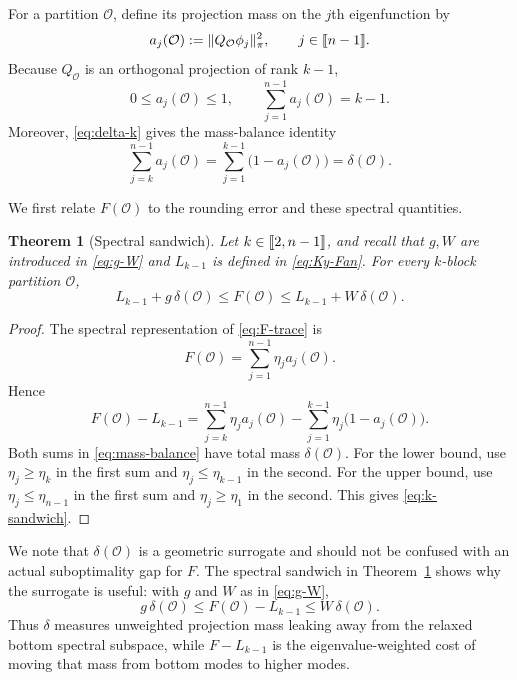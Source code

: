 \documentclass[11pt]{article}
\newtheorem{theorem}{Theorem}[section]
\newcommand{\1}{\mathbf{1}}
\providecommand{\llbracket}{\mathopen{[\mkern-2.7mu[}}
\providecommand{\rrbracket}{\mathclose{]\mkern-2.7mu]}}
\begin{document}
For a partition $\mathcal O$, define its projection mass on the
$j$th eigenfunction by
\begin{equation}
    a_j(\mathcal O)
    :=\|Q_{\mathcal O}\phi_j\|_\pi^2,
    \qquad j\in\llbracket n-1\rrbracket.
    \label{eq:spectral-projection-mass}
\end{equation}
Because $Q_{\mathcal O}$ is an orthogonal projection of rank $k-1$,
\begin{equation*}
    0\leq a_j(\mathcal O)\leq1,
    \qquad
    \sum_{j=1}^{n-1}a_j(\mathcal O)=k-1.
\end{equation*}
Moreover, \eqref{eq:delta-k} gives the mass-balance identity
\begin{equation}
    \sum_{j=k}^{n-1}a_j(\mathcal O)
    =\sum_{j=1}^{k-1}\bigl(1-a_j(\mathcal O)\bigr)
    =\delta(\mathcal O).
    \label{eq:mass-balance}
\end{equation}

We first relate $F(\mathcal O)$ to the rounding error and these
spectral quantities.
\begin{theorem}[Spectral sandwich]
\label{thm:k-sandwich}
Let $k\in\llbracket 2,n-1\rrbracket$, and recall that $g, W$ are introduced in \eqref{eq:g-W} and $L_{k-1}$ is defined in \eqref{eq:Ky-Fan}. For every $k$-block partition $\mathcal O$,
\begin{equation}
    L_{k-1}+g\,\delta(\mathcal O)
    \leq F(\mathcal O)
    \leq L_{k-1}+W\,\delta(\mathcal O).
    \label{eq:k-sandwich}
\end{equation}
\end{theorem}

\begin{proof}
The spectral representation of \eqref{eq:F-trace} is
\[
    F(\mathcal O)
    =\sum_{j=1}^{n-1}\eta_ja_j(\mathcal O).
\]
Hence
\[
    F(\mathcal O)-L_{k-1}
    =\sum_{j=k}^{n-1}\eta_ja_j(\mathcal O)
     -\sum_{j=1}^{k-1}\eta_j
       \bigl(1-a_j(\mathcal O)\bigr).
\]
Both sums in \eqref{eq:mass-balance} have total mass
$\delta(\mathcal O)$.  For the lower bound, use
$\eta_j\geq\eta_{k}$ in the first sum and
$\eta_j\leq\eta_{k-1}$ in the second.  For the upper bound, use
$\eta_j\leq\eta_{n-1}$ in the first sum and
$\eta_j\geq\eta_1$ in the second.  This gives
\eqref{eq:k-sandwich}.
\end{proof}

We note that $\delta(\mathcal O)$ is a geometric surrogate and should not
be confused with an actual suboptimality gap for $F$.  The
spectral sandwich in Theorem~\ref{thm:k-sandwich} shows why the
surrogate is useful: with $g$ and $W$ as in \eqref{eq:g-W},
\[
g\,\delta(\mathcal O)
\leq F(\mathcal O)-L_{k-1}
\leq W\,\delta(\mathcal O).
\]
Thus $\delta$ measures unweighted projection mass leaking away from
the relaxed bottom spectral subspace, while
$F-L_{k-1}$ is the eigenvalue-weighted cost of moving that mass from
bottom modes to higher modes.
\end{document}

